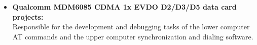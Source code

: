 \documentclass{resume}
\begin{document}
{\begin{itemize}
  Undertake the underlying implementation works of \textsc{GSDI} dual-card support.\\ 
  Undertake the works of the \textsc{OEM} interface layer and the application layer.\\ 
  Responsible for the modules such as: \textsc{SMS} (\textsc{GSM 03.38}/ \textsc{03.40}/ \textsc{07.05}), \textsc{MMS} (\textsc{TS23.140}/ \textsc{OMA}), 
  \textsc{STK} (\textsc{GSM 11.14}), \textsc{SIM} card (\textsc{TS 31.102}), \textsc{Bluetooth}, \textsc{Brew JavaVM}, \textsc{WWW} (Full \textsc{HTML}) browser, \textsc{Multimedia}, and \textsc{Input Method Engine}.
    \item \textbf{Qualcomm MDM6085 CDMA 1x EVDO D2/D3/D5 data card projects:}\\
  Responsible for the development and debugging tasks of the lower computer AT commands and the upper computer synchronization and dialing software.
  \end{itemize}
}
\spaceline{}
\end{document}
